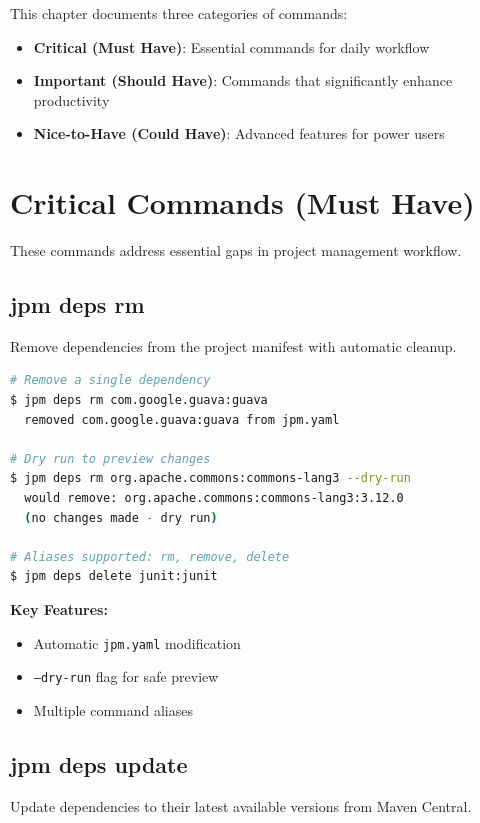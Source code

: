 \documentclass[12pt,a4paper]{report}
\begin{document}
This chapter documents three categories of commands:
\begin{itemize}
    \item \textbf{Critical (Must Have)}: Essential commands for daily workflow
    \item \textbf{Important (Should Have)}: Commands that significantly enhance productivity
    \item \textbf{Nice-to-Have (Could Have)}: Advanced features for power users
\end{itemize}

\section{Critical Commands (Must Have)}

These commands address essential gaps in project management workflow.

\subsection{jpm deps rm}

Remove dependencies from the project manifest with automatic cleanup.

\begin{lstlisting}[language=bash, caption=Dependency Removal]
# Remove a single dependency
$ jpm deps rm com.google.guava:guava
  removed com.google.guava:guava from jpm.yaml

# Dry run to preview changes
$ jpm deps rm org.apache.commons:commons-lang3 --dry-run
  would remove: org.apache.commons:commons-lang3:3.12.0
  (no changes made - dry run)

# Aliases supported: rm, remove, delete
$ jpm deps delete junit:junit
\end{lstlisting}

\textbf{Key Features:}
\begin{itemize}
    \item Automatic \texttt{jpm.yaml} modification
    \item \texttt{--dry-run} flag for safe preview
    \item Multiple command aliases
\end{itemize}

\subsection{jpm deps update}

Update dependencies to their latest available versions from Maven Central.
\end{document}
